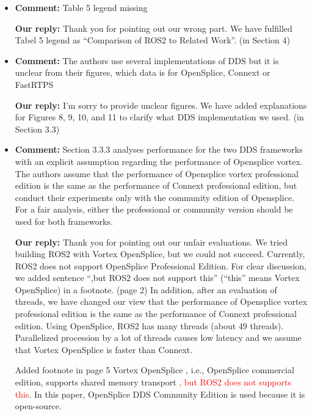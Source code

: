 \documentclass{article}
\begin{document}
\begin{itemize}
\item \begin{flushleft}
  \textbf{Comment:} Table 5 legend missing
\end{flushleft}

  \begin{flushleft}
    \textbf{Our reply:} Thank you for pointing out our wrong part. We have fulfilled Tabel 5 legend as ``Comparison of ROS2 to Related Work''. (in Section 4)
  \end{flushleft}

\item \begin{flushleft}
  \textbf{Comment:} The authors use several implementations of DDS but it is unclear from their figures, which data is for OpenSplice, Connext or FastRTPS
\end{flushleft}

  \begin{flushleft}
    \textbf{Our reply:} I'm sorry to provide unclear figures. We have added explanations for Figures 8, 9, 10, and 11 to clarify what DDS implementation we used. (in Section 3.3)
  \end{flushleft}

\item \begin{flushleft}
  \textbf{Comment:} Section 3.3.3 analyses performance for the two DDS frameworks with an explicit assumption regarding the performance of Opensplice vortex. The authors assume that the performance of Opensplice vortex professional edition is the same as the performance of Connext professional edition, but conduct their experiments only with the community edition of Opensplice. For a fair analysis, either the professional or community version should be used for both frameworks.
\end{flushleft}

  \begin{flushleft}
    \textbf{Our reply:} Thank you for pointing out our unfair evaluations. 
    We tried building ROS2 with Vortex OpenSplice, but we could not succeed. 
    Currently, ROS2 does not support OpenSplice Professional Edition. For clear discussion, we added sentence ``,but ROS2 does not support this'' (``this'' means Vortex OpenSplice) in a footnote. (page 2)
    In addition, after an evaluation of threads, we have changed our view that the performance of Opensplice vortex professional edition is the same as the performance of Connext professional edition. 
    Using OpenSplice, ROS2 has many threads (about 49 threads). 
    Parallelized procession by a lot of threads causes low latency and we assume that Vortex OpenSplice is faster than Connext.
  \end{flushleft}
  \begin{itembox}[|]{Added footnote in page 5}
    Vortex OpenSplice \cite{ospl_vortex}, i.e., OpenSplice commercial edition, supports shared memory transport \textcolor{red}{, but ROS2 does not supports this}. In this paper, OpenSplice DDS Community Edition is used because it is open-source.
  \end{itembox}\\

\end{itemize}
\end{document}
